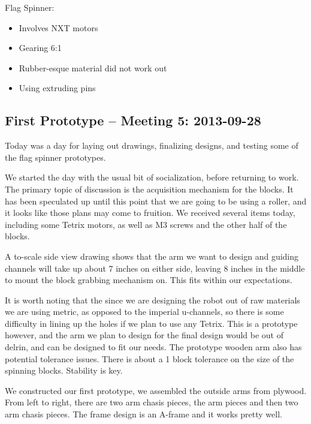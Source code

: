 Flag Spinner:
\begin{itemize}
\item Involves NXT motors
\item Gearing 6:1
\item Rubber-esque material did not work out
\item Using extruding pins
\end{itemize}

\newpage \subsection{First Prototype -- Meeting 5: 2013-09-28}
Today was a day for laying out drawings, finalizing designs, and testing some of the flag spinner prototypes. 

We started the day with the usual bit of socialization, before returning to work. The primary topic of discussion is the acquisition mechanism for the blocks. It has been speculated up until this point that we are going to be using a roller, and it looks like those plans may come to fruition. 
We received several items today, including some Tetrix motors, as well as M3 screws and the other half of the blocks.

A to-scale side view drawing shows that the arm we want to design and guiding channels will take up about 7 inches on either side, leaving 8 inches in the middle to mount the block grabbing mechanism on. This fits within our expectations.

It is worth noting that the since we are designing the robot out of raw materials we are using metric, as opposed to the imperial u-channels, so there is some difficulty in lining up the holes if we plan to use any Tetrix. This is a prototype however, and the arm we plan to design for the final design would be out of delrin, and can be designed to fit our needs. The prototype wooden arm also has potential tolerance issues. There is about a 1 block tolerance on the size of the spinning blocks. Stability is key. 

We constructed our first prototype, we assembled the outside arms from plywood. From left to right, there are two arm chasis pieces, the arm pieces and then two arm chasis pieces. The frame design is an A-frame and it works pretty well.

